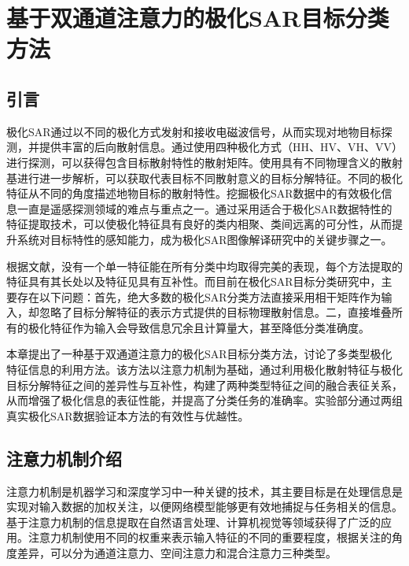 \chapter{基于双通道注意力的极化SAR目标分类方法}
\section{引言}
极化SAR通过以不同的极化方式发射和接收电磁波信号，从而实现对地物目标探测，并提供丰富的后向散射信息。通过使用四种极化方式（HH、HV、VH、VV）进行探测，可以获得包含目标散射特性的散射矩阵。使用具有不同物理含义的散射基进行进一步解析，可以获取代表目标不同散射意义的目标分解特征。不同的极化特征从不同的角度描述地物目标的散射特性。挖掘极化SAR数据中的有效极化信息一直是遥感探测领域的难点与重点之一。通过采用适合于极化SAR数据特性的特征提取技术，可以使极化特征具有良好的类内相聚、类间远离的可分性，从而提升系统对目标特性的感知能力，成为极化SAR图像解译研究中的关键步骤之一。

根据文献\cite{刘高峰2014极化,1017062722.nh,1021744178.nh}，没有一个单一特征能在所有分类中均取得完美的表现，每个方法提取的特征具有其长处以及特征见具有互补性。而目前在极化SAR目标分类研究中，主要存在以下问题：首先，绝大多数的极化SAR分类方法直接采用相干矩阵作为输入，却忽略了目标分解特征的表示方式提供的目标物理散射信息。二，直接堆叠所有的极化特征作为输入会导致信息冗余且计算量大，甚至降低分类准确度。

本章提出了一种基于双通道注意力的极化SAR目标分类方法，讨论了多类型极化特征信息的利用方法。该方法以注意力机制为基础，通过利用极化散射特征与极化目标分解特征之间的差异性与互补性，构建了两种类型特征之间的融合表征关系，从而增强了极化信息的表征性能，并提高了分类任务的准确率。实验部分通过两组真实极化SAR数据验证本方法的有效性与优越性。

\section{注意力机制介绍}
\label{sec:sce3_1}
注意力机制是机器学习和深度学习中一种关键的技术，其主要目标是在处理信息是实现对输入数据的加权关注，以便网络模型能够更有效地捕捉与任务相关的信息。基于注意力机制的信息提取在自然语言处理、计算机视觉等领域获得了广泛的应用。注意力机制使用不同的权重来表示输入特征的不同的重要程度，根据关注的角度差异，可以分为通道注意力、空间注意力和混合注意力三种类型。

